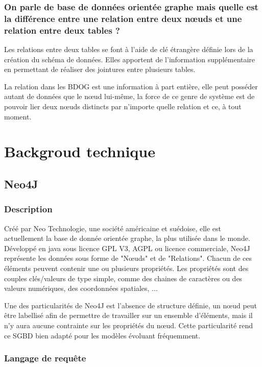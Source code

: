 \documentclass[a4paper,fleqn,12pt]{report}
\begin{document}
\subsection*{On parle de base de données orientée graphe mais quelle est la différence entre une relation entre deux nœuds et une relation entre deux tables ?}
Les relations entre deux tables se font à l’aide de clé étrangère définie lors de la création du schéma de données. Elles apportent de l’information supplémentaire en permettant de réaliser des jointures entre plusieurs tables.

La relation dans les BDOG est une information à part entière, elle peut posséder autant de données que le nœud lui-même, la force de ce genre de système est de pouvoir lier deux nœuds distincts par n’importe quelle relation et ce, à tout moment.

\chapter{Backgroud technique}
\section{Neo4J}

\subsection{Description}

Créé par Neo Technologie, une société américaine et suédoise, elle est actuellement la base de donnée orientée graphe, la plus utilisée dans le monde\cite{DBEnginesSite}. Développé en java sous licence GPL V3, AGPL ou licence commerciale, Neo4J représente les données sous forme de "Nœuds" et de "Relations". Chacun de ces éléments peuvent contenir une ou plusieurs propriétés. Les propriétés sont des couples clés/valeurs de type simple, comme des chaines de caractères ou des valeurs numériques, des coordonnées spatiales, ... \cite{Neo4JSite}

Une des particularités de Neo4J est l’absence de structure définie, un nœud peut être labellisé afin de permettre de travailler sur un ensemble d’éléments, mais il n’y aura aucune contrainte sur les propriétés du nœud. Cette particularité rend ce SGBD bien adapté pour les modèles évoluant fréquemment.


\subsection{Langage de requête}
\end{document}
